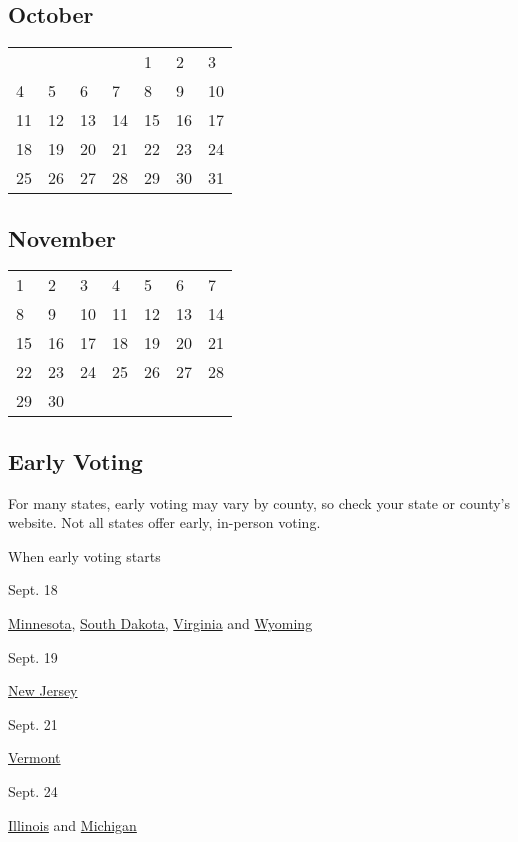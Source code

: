 \hypertarget{october}{%
\subsection{October}\label{october}}

\begin{longtable}[]{@{}lllllll@{}}
\toprule
\endhead
& & & & 1 & 2 & 3\tabularnewline
4 & 5 & 6 & 7 & 8 & 9 & 10\tabularnewline
11 & 12 & 13 & 14 & 15 & 16 & 17\tabularnewline
18 & 19 & 20 & 21 & 22 & 23 & 24\tabularnewline
25 & 26 & 27 & 28 & 29 & 30 & 31\tabularnewline
\bottomrule
\end{longtable}

\hypertarget{november}{%
\subsection{November}\label{november}}

\begin{longtable}[]{@{}lllllll@{}}
\toprule
\endhead
1 & 2 & 3 & 4 & 5 & 6 & 7\tabularnewline
8 & 9 & 10 & 11 & 12 & 13 & 14\tabularnewline
15 & 16 & 17 & 18 & 19 & 20 & 21\tabularnewline
22 & 23 & 24 & 25 & 26 & 27 & 28\tabularnewline
29 & 30 & & & & &\tabularnewline
\bottomrule
\end{longtable}

\hypertarget{early-voting}{%
\subsection{Early Voting}\label{early-voting}}

For many states, early voting may vary by county, so check your state or
county's website. Not all states offer early, in-person voting.

When early voting starts

Sept. 18

\href{https://www.sos.state.mn.us/elections-voting/}{Minnesota},
\href{https://sdsos.gov/elections-voting/default.aspx}{South Dakota},
\href{https://www.elections.virginia.gov/}{Virginia} and
\href{https://soswy.state.wy.us/elections}{Wyoming}

Sept. 19

\href{https://www.state.nj.us/state/elections/index.shtml}{New Jersey}

Sept. 21

\href{https://sos.vermont.gov/elections/}{Vermont}

Sept. 24

\href{https://www.elections.il.gov/}{Illinois} and
\href{https://www.michigan.gov/sos/0,4670,7-127-1633---,00.html}{Michigan}

